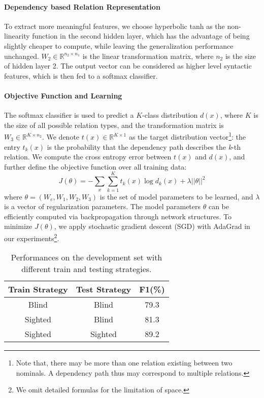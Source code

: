 \documentclass[11pt,a4paper]{article}
\begin{document}
\paragraph{Dependency based Relation Representation}
To extract more meaningful features, we choose hyperbolic tanh as the non-linearity function in the second hidden layer, which has the advantage of being slightly cheaper to compute, while leaving the generalization performance unchanged. $W_2 \in \mathbb{R}^{n_2\times n_1}$ is the linear transformation matrix, where $n_2$ is the size of hidden layer 2. The output vector can be considered as higher level syntactic features, which is then fed to a softmax classifier.

\paragraph{Objective Function and Learning}
The softmax classifier is used to predict a $K$-class distribution $d(x)$, where  $K$ is the size of all possible relation types, and 
the transformation matrix is $W_3 \in \mathbb{R}^{K\times n_2}$. 
We denote $t(x) \in \mathbb{R}^{K\times 1}$ as the target distribution vector\footnote{Note that, there may be more than one relation existing between two nominals. A dependency path thus may correspond to multiple relations.}:
the entry $t_{k}(x)$ is the probability that the dependency path describes the \textit{k}-th relation. 
We compute the cross entropy error between $t(x)$ and $d(x)$, and further define the objective function over all training data:
\begin{displaymath}
J(\theta) = - \sum_{x} \sum_{k=1}^{K} t_k(x) \log d_k(x) + \lambda||\theta||^{2} 
\end{displaymath}
where $\theta = (W_e, W_1, W_2, W_3)$ is the set of model parameters to be learned, and 
$\lambda$ is a vector of regularization parameters. The model parameters $\theta$ can be efficiently computed via 
backpropagation through network structures. To minimize $J(\theta)$, we apply stochastic gradient descent (SGD) with AdaGrad \cite{DBLP:journals/jmlr/DuchiHS11} in our experiments\footnote{We omit detailed formulas for the limitation of space.}.

\begin{table}
\small
\centering
\begin{tabular}{c|c|c}
\hline
Train Strategy & Test Strategy & F1(\%) \\
\hline
Blind & Blind & 79.3\\
\hline
Sighted & Blind & 81.3\\
\hline
Sighted & Sighted & 89.2\\
\hline
\end{tabular}
\caption{Performances on the development set with different train and testing strategies.}
\label{tab:ns_results}
\end{table}
\end{document}
